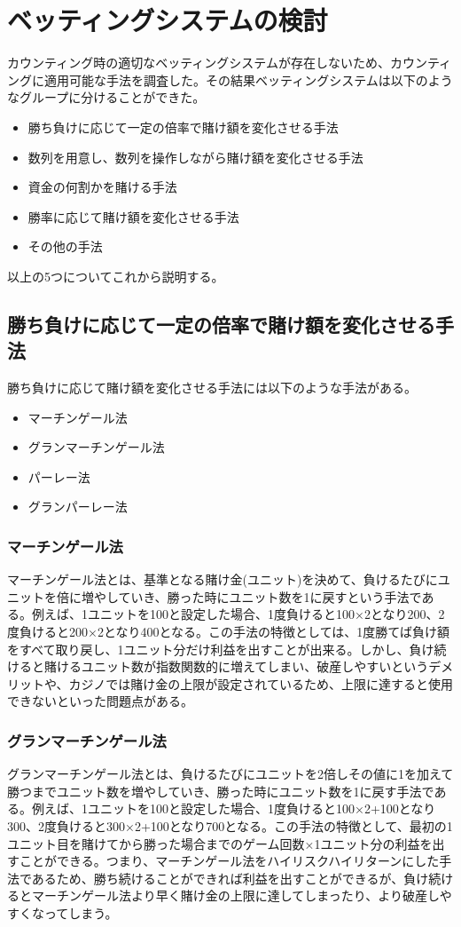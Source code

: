 \section{ベッティングシステムの検討}
カウンティング時の適切なベッティングシステムが存在しないため、カウンティングに適用可能な手法を調査した。その結果ベッティングシステムは以下のようなグループに分けることができた。
\begin{itemize}
\item 勝ち負けに応じて一定の倍率で賭け額を変化させる手法
\item 数列を用意し、数列を操作しながら賭け額を変化させる手法
\item 資金の何割かを賭ける手法
\item 勝率に応じて賭け額を変化させる手法
\item その他の手法
\end{itemize}
以上の5つについてこれから説明する。

\subsection{勝ち負けに応じて一定の倍率で賭け額を変化させる手法}
勝ち負けに応じて賭け額を変化させる手法には以下のような手法がある。
\begin{itemize}
\item マーチンゲール法
\item グランマーチンゲール法
\item パーレー法
\item グランパーレー法
\end{itemize}
\subsubsection{マーチンゲール法}
マーチンゲール法とは、基準となる賭け金(ユニット)を決めて、負けるたびにユニットを倍に増やしていき、勝った時にユニット数を1に戻すという手法である。例えば、1ユニットを100と設定した場合、1度負けると100×2となり200、2度負けると200×2となり400となる。この手法の特徴としては、1度勝てば負け額をすべて取り戻し、1ユニット分だけ利益を出すことが出来る。しかし、負け続けると賭けるユニット数が指数関数的に増えてしまい、破産しやすいというデメリットや、カジノでは賭け金の上限が設定されているため、上限に達すると使用できないといった問題点がある。
\subsubsection{グランマーチンゲール法}
グランマーチンゲール法とは、負けるたびにユニットを2倍しその値に1を加えて勝つまでユニット数を増やしていき、勝った時にユニット数を1に戻す手法である。例えば、1ユニットを100と設定した場合、1度負けると100×2+100となり300、2度負けると300×2+100となり700となる。この手法の特徴として、最初の1ユニット目を賭けてから勝った場合までのゲーム回数×1ユニット分の利益を出すことができる。つまり、マーチンゲール法をハイリスクハイリターンにした手法であるため、勝ち続けることができれば利益を出すことができるが、負け続けるとマーチンゲール法より早く賭け金の上限に達してしまったり、より破産しやすくなってしまう。
